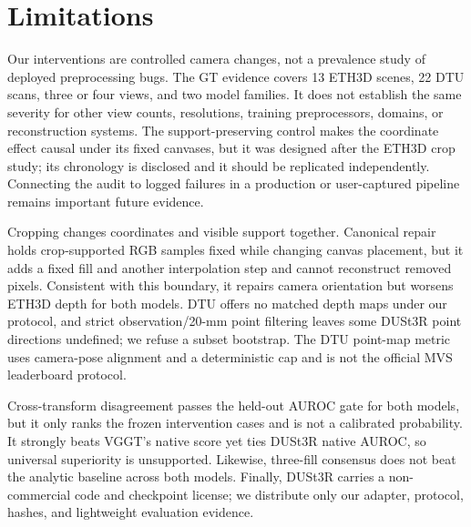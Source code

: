 \section{Limitations}
\label{sec:limitations}

Our interventions are controlled camera changes, not a prevalence study of
deployed preprocessing bugs.  The GT evidence covers 13 ETH3D scenes, 22 DTU
scans, three or four views, and two model families.  It does not establish the
same severity for other view counts, resolutions, training preprocessors,
domains, or reconstruction systems.  The support-preserving control makes the
coordinate effect causal under its fixed canvases, but it was designed after
the ETH3D crop study; its chronology is disclosed and it should be replicated
independently.  Connecting the audit to logged failures in a production or
user-captured pipeline remains important future evidence.

Cropping changes coordinates and visible support together.  Canonical repair
holds crop-supported RGB samples fixed while changing canvas placement, but it
adds a fixed fill and another interpolation step and cannot reconstruct removed
pixels.  Consistent with this boundary, it repairs camera orientation but
worsens ETH3D depth for both models.  DTU offers no matched depth maps under our
protocol, and strict observation/20-mm point filtering leaves some DUSt3R point
directions undefined; we refuse a subset bootstrap.  The DTU point-map metric
uses camera-pose alignment and a deterministic cap and is not the official MVS
leaderboard protocol.

Cross-transform disagreement passes the held-out AUROC gate for both models,
but it only ranks the frozen intervention cases and is not a calibrated
probability.  It strongly beats VGGT's native score yet ties DUSt3R native AUROC,
so universal superiority is unsupported.  Likewise, three-fill consensus does
not beat the analytic baseline across both models.  Finally, DUSt3R carries a
non-commercial code and checkpoint license; we distribute only our adapter,
protocol, hashes, and lightweight evaluation evidence.
